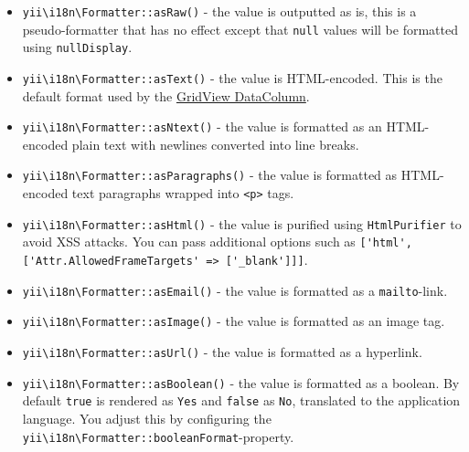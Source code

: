 \begin{itemize}
\item \texttt{yii{\allowbreak{}\textbackslash}i18n{\allowbreak{}\textbackslash}Formatter\allowbreak{}::\allowbreak{}asRaw()} - the value is outputted as is, this is a pseudo-formatter that has no effect except that
\lstinline|null| values will be formatted using \texttt{nullDisplay}.
\item \texttt{yii{\allowbreak{}\textbackslash}i18n{\allowbreak{}\textbackslash}Formatter\allowbreak{}::\allowbreak{}asText()} - the value is HTML-encoded.
This is the default format used by the \hyperref[output-data-widgets.md::data-column]{GridView DataColumn}.
\item \texttt{yii{\allowbreak{}\textbackslash}i18n{\allowbreak{}\textbackslash}Formatter\allowbreak{}::\allowbreak{}asNtext()} - the value is formatted as an HTML-encoded plain text with newlines converted
into line breaks.
\item \texttt{yii{\allowbreak{}\textbackslash}i18n{\allowbreak{}\textbackslash}Formatter\allowbreak{}::\allowbreak{}asParagraphs()} - the value is formatted as HTML-encoded text paragraphs wrapped
into \lstinline|<p>| tags.
\item \texttt{yii{\allowbreak{}\textbackslash}i18n{\allowbreak{}\textbackslash}Formatter\allowbreak{}::\allowbreak{}asHtml()} - the value is purified using \texttt{HtmlPurifier} to avoid XSS attacks. You can
pass additional options such as \lstinline|['html', ['Attr.AllowedFrameTargets' => ['_blank']]]|.
\item \texttt{yii{\allowbreak{}\textbackslash}i18n{\allowbreak{}\textbackslash}Formatter\allowbreak{}::\allowbreak{}asEmail()} - the value is formatted as a \lstinline|mailto|-link.
\item \texttt{yii{\allowbreak{}\textbackslash}i18n{\allowbreak{}\textbackslash}Formatter\allowbreak{}::\allowbreak{}asImage()} - the value is formatted as an image tag.
\item \texttt{yii{\allowbreak{}\textbackslash}i18n{\allowbreak{}\textbackslash}Formatter\allowbreak{}::\allowbreak{}asUrl()} - the value is formatted as a hyperlink.
\item \texttt{yii{\allowbreak{}\textbackslash}i18n{\allowbreak{}\textbackslash}Formatter\allowbreak{}::\allowbreak{}asBoolean()} - the value is formatted as a boolean. By default \lstinline|true| is rendered
as \lstinline|Yes| and \lstinline|false| as \lstinline|No|, translated to the application language. You adjust this by configuring
the \texttt{yii{\allowbreak{}\textbackslash}i18n{\allowbreak{}\textbackslash}Formatter\allowbreak{}::\allowbreak{}booleanFormat}-property.
\end{itemize}
